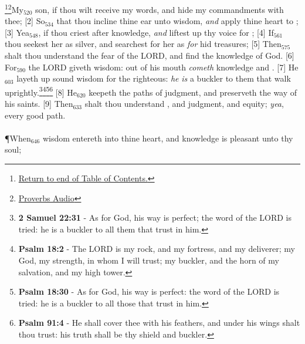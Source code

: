 \footnote{\textcolor[cmyk]{0.99998,1,0,0}{\hyperlink{TOC}{Return to end of Table of Contents.}}}\footnote{\href{https://www.audioverse.org/english/audiobibles/books/ENGKJV/O/Prov/1}{\textcolor[cmyk]{0.99998,1,0,0}{Proverbs Audio}}}\textcolor[cmyk]{0.99998,1,0,0}{My\textcolor{jungle}{$_{520}$} son, if thou wilt receive my words, and hide my commandments with thee;}
[2] \textcolor[cmyk]{0.99998,1,0,0}{So\textcolor{jungle}{$_{534}$} that thou incline thine ear unto wisdom, \emph{and} apply thine heart to ;}
[3] \textcolor[cmyk]{0.99998,1,0,0}{Yea\textcolor{jungle}{$_{548}$}, if thou criest after knowledge, \emph{and} liftest up thy voice for ;}
[4] \textcolor[cmyk]{0.99998,1,0,0}{If\textcolor{jungle}{$_{561}$} thou seekest her as silver, and searchest for her as \emph{for} hid treasures;}
[5] \textcolor[cmyk]{0.99998,1,0,0}{Then\textcolor{jungle}{$_{575}$} shalt thou understand the fear of the LORD, and find the knowledge of God.}
[6] \textcolor[cmyk]{0.99998,1,0,0}{For\textcolor{jungle}{$_{590}$} the LORD giveth wisdom: out of his mouth \emph{cometh} knowledge and .}
[7] \textcolor[cmyk]{0.99998,1,0,0}{He\textcolor{jungle}{$_{603}$} layeth up sound wisdom for the righteous: \emph{he} \emph{is} a buckler to them that walk uprightly.}\footnote{\textbf{2 Samuel 22:31} - As for God, his way is perfect; the word of the LORD is tried: he is a buckler to all them that trust in him.}\footnote{\textbf{Psalm 18:2} - The LORD is my rock, and my fortress, and my deliverer; my God, my strength, in whom I will trust; my buckler, and the horn of my salvation, and my high tower.}\footnote{\textbf{Psalm 18:30} - As for God, his way is perfect: the word of the LORD is tried: he is a buckler to all those that trust in him.}\footnote{\textbf{Psalm 91:4} - He shall cover thee with his feathers, and under his wings shalt thou trust: his truth shall be thy shield and buckler.}
[8] \textcolor[cmyk]{0.99998,1,0,0}{He\textcolor{jungle}{$_{620}$} keepeth the paths of judgment, and preserveth the way of his saints.}
[9] \textcolor[cmyk]{0.99998,1,0,0}{Then\textcolor{jungle}{$_{633}$} shalt thou understand , and judgment, and equity; \emph{yea}, every good path.}\\
\\
\P \textcolor[cmyk]{0.99998,1,0,0}{When\textcolor{jungle}{$_{646}$} wisdom entereth into thine heart, and knowledge is pleasant unto thy soul;}
